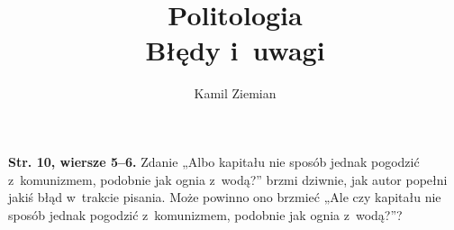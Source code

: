 \documentclass[a4paper,11pt]{article}
\title{Politologia \\
  {\Large Błędy i~uwagi}}
\author{Kamil Ziemian}
\begin{document}





\maketitle  %


























\noindent
\textbf{Str. 10, wiersze 5--6.} Zdanie „Albo kapitału nie sposób jednak
pogodzić z~komunizmem, podobnie jak ognia z~wodą?” brzmi dziwnie,
jak autor popełni jakiś błąd w~trakcie pisania. Może powinno ono brzmieć
„Ale czy kapitału nie sposób jednak pogodzić z~komunizmem, podobnie jak
ognia z~wodą?”?

\vspace{\spaceFour}
\end{document}
